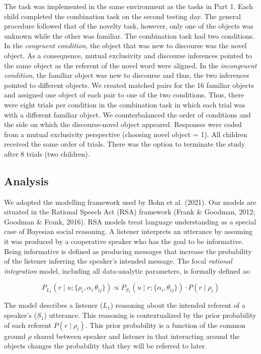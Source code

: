 \documentclass[
  man,floatsintext]{apa6}
\begin{document}
The task was implemented in the same environment as the tasks in Part 1. Each child completed the combination task on the second testing day. The general procedure followed that of the novelty task, however, only one of the objects was unknown while the other was familiar. The combination task had two conditions. In the \emph{congruent condition}, the object that was new to discourse was the novel object. As a consequence, mutual exclusivity and discourse inferences pointed to the same object as the referent of the novel word were aligned. In the \emph{incongruent condition}, the familiar object was new to discourse and thus, the two inferences pointed to different objects. We created matched pairs for the 16 familiar objects and assigned one object of each pair to one of the two conditions. Thus, there were eight trials per condition in the combination task in which each trial was with a different familiar object. We counterbalanced the order of conditions and the side on which the discourse-novel object appeared. Responses were coded from a mutual exclusivity perspective (choosing novel object = 1). All children received the same order of trials. There was the option to terminate the study after 8 trials (two children).

\hypertarget{analysis-1}{%
\subsection{Analysis}\label{analysis-1}}

We adopted the modelling framework used by Bohn et al. (2021). Our models are situated in the Rational Speech Act (RSA) framework (Frank \& Goodman, 2012; Goodman \& Frank, 2016). RSA models treat language understanding as a special case of Bayesian social reasoning. A listener interprets an utterance by assuming it was produced by a cooperative speaker who has the goal to be informative. Being informative is defined as producing messages that increase the probability of the listener inferring the speaker's intended message. The focal \emph{rational integration} model, including all data-analytic parameters, is formally defined as:

\begin{equation}
P_{L_1}(r \mid u; \{\rho_i, \alpha_i\, \theta_{ij}\})\propto P_{S_1}(u \mid r; \{\alpha_i, \theta_{ij}\}) \cdot P(r \mid \rho_i)
\label{eq:rsafull1}
\end{equation}

The model describes a listener (\(L_1\)) reasoning about the intended referent of a speaker's (\(S_1\)) utterance. This reasoning is contextualized by the prior probability of each referent \(P(r \mid \rho_i)\). This prior probability is a function of the common ground \(\rho\) shared between speaker and listener in that interacting around the objects changes the probability that they will be referred to later.
\end{document}
